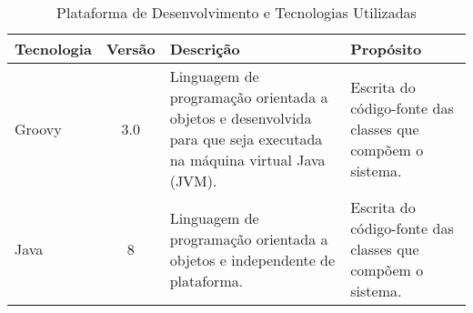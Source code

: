 \begin{table}[h]
	\centering	
	\vspace{0.5cm}
	\footnotesize
	\caption{Plataforma de Desenvolvimento e Tecnologias Utilizadas}	
	\label{tabela-plataforma}
	\begin{tabular}{|p{1.6cm}|c|p{5cm}|p{6.5cm}|}  \hline 
 		
 		\rowcolor[rgb]{0.8,0.8,0.8} Tecnologia & Versão & Descrição & Propósito \\\hline 
 		
		
		Groovy & 3.0 & Linguagem de programação orientada a objetos e desenvolvida para que seja executada na máquina virtual Java (JVM). & Escrita do código-fonte das classes que compõem o sistema. \\\hline

		Java & 8 & Linguagem de programação orientada a objetos e independente de plataforma. & Escrita do código-fonte das classes que compõem o sistema. \\\hline
		
		
		
		
		
		

\end{tabular}
\end{table}
